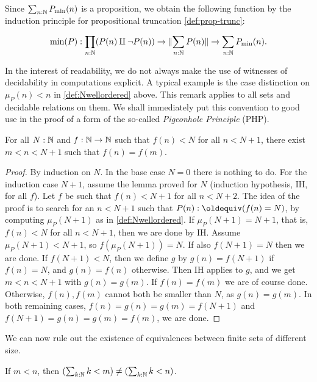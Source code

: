 \begin{definition}
Since $\sum_{n:\mathbb{N}} P_{\min}(n)$ is a proposition, 
we obtain the following function by the induction
principle for propositional truncation \cref{def:prop-trunc}:

\begin{align}\label{eqn:min}%
\min(P) : \prod_{n:\NN}(P(n)\amalg\neg P(n)) \to 
           \Trunc{\sum_{n:\NN} P(n)} \to  \sum_{n:\NN} P_{\min}(n).
\end{align}
\end{definition}

\begin{remark}\label{rem:computations-can-decide}
In the interest of readability, we do not always make the use
of witnesses of decidability in computations explicit.
A typical example is the case distinction on $\mu_P(n) < n$ in
\cref{def:Nwellordered} above. This remark applies to all
sets and decidable relations on them. We shall immediately put
this convention to good use in the proof of a form of the so-called
\emph{Pigeonhole Principle} (PHP).
\end{remark}

\begin{lemma}\label{lem:PHP}
For all $N:\mathbb{N}$ and $f:\mathbb{N}\to\mathbb{N}$ such that $f(n)<N$
for all $n<N+1$, there exist $m < n < N+1$ such that $f(n)=f(m)$.
\end{lemma}
\begin{proof}
By induction on $N$. In the base case $N=0$ there is nothing to do.
For the induction case $N+1$, assume the lemma proved for $N$
(induction hypothesis, IH, for all $f$). Let $f$ be such 
that $f(n)<N+1$ for all $n<N+2$. The idea of the proof is
to search for an $n<N+1$ such that $P(n)\defeq (f(n)=N)$,
by computing $\mu_P(N+1)$ as in \cref{def:Nwellordered}.
If $\mu_P(N+1)=N+1$, that is, $f(n)<N$ for all $n<N+1$,
then we are done by IH. Assume $\mu_P(N+1) < N+1$,
so $f(\mu_P(N+1))=N$.
If also $f(N+1)=N$ then we are done.
If $f(N+1)<N$, then we define $g$ by $g(n)=f(N+1)$
if $f(n)= N$, and $g(n)=f(n)$ otherwise. 
Then IH applies to $g$, and we get $m < n < N+1$ with 
$g(n)=g(m)$. If $f(n)=f(m)$ we are of course done. 
Otherwise, $f(n),f(m)$ cannot both be smaller than $N$, 
as $g(n)=g(m)$. In both remaining cases, 
$f(n)=g(n)=g(m)=f(N+1)$ and $f(N+1)=g(n)=g(m)=f(m)$,
we are done.
\end{proof}

We can now rule out the existence of equivalences between finite
sets of different size.
\begin{corollary}\label{cor:Fin-n-injective}
If $m<n$, then $(\sum_{k:\mathbb{N}} k<m) \neq (\sum_{k:\mathbb{N}} k<n)$.
\end{corollary}

